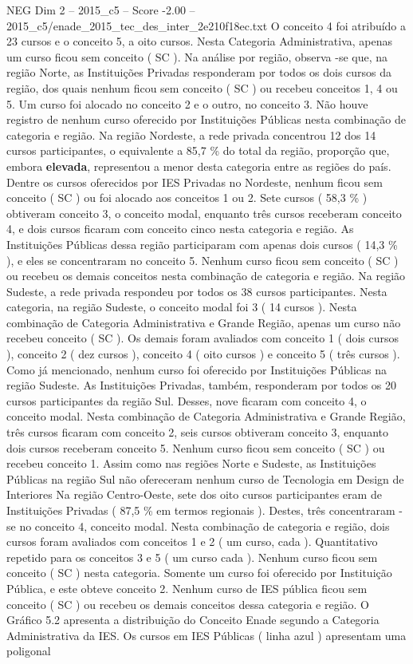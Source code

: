 \begin{textsample}{NEG Dim 2 – 2015\_c5 – Score -2.00 – 2015\_c5/enade\_2015\_tec\_des\_inter\_2e210f18ec.txt}
O conceito 4 foi atribuído a 23 cursos e o conceito 5, a oito cursos.
Nesta Categoria Administrativa, apenas um curso ficou sem conceito ( SC ).
Na análise por região, observa -se que, na região Norte, as Instituições Privadas responderam por todos os dois cursos da região, dos quais nenhum ficou sem conceito ( SC ) ou recebeu conceitos 1, 4 ou 5.
Um curso foi alocado no conceito 2 e o outro, no conceito 3.
Não houve registro de nenhum curso oferecido por Instituições Públicas nesta combinação de categoria e região.
Na região Nordeste, a rede privada concentrou 12 dos 14 cursos participantes, o equivalente a 85,7 \% do total da região, proporção que, embora \textbf{elevada}, representou a menor desta categoria entre as regiões do país.
Dentre os cursos oferecidos por IES Privadas no Nordeste, nenhum ficou sem conceito ( SC ) ou foi alocado aos conceitos 1 ou 2.
Sete cursos ( 58,3 \% ) obtiveram conceito 3, o conceito modal, enquanto três cursos receberam conceito 4, e dois cursos ficaram com conceito cinco nesta categoria e região.
As Instituições Públicas dessa região participaram com apenas dois cursos ( 14,3 \% ), e eles se concentraram no conceito 5.
Nenhum curso ficou sem conceito ( SC ) ou recebeu os demais conceitos nesta combinação de categoria e região.
Na região Sudeste, a rede privada respondeu por todos os 38 cursos participantes.
Nesta categoria, na região Sudeste, o conceito modal foi 3 ( 14 cursos ).
Nesta combinação de Categoria Administrativa e Grande Região, apenas um curso não recebeu conceito ( SC ).
Os demais foram avaliados com conceito 1 ( dois cursos ), conceito 2 ( dez cursos ), conceito 4 ( oito cursos ) e conceito 5 ( três cursos ).
Como já mencionado, nenhum curso foi oferecido por Instituições Públicas na região Sudeste.
As Instituições Privadas, também, responderam por todos os 20 cursos participantes da região Sul.
Desses, nove ficaram com conceito 4, o conceito modal.
Nesta combinação de Categoria Administrativa e Grande Região, três cursos ficaram com conceito 2, seis cursos obtiveram conceito 3, enquanto dois cursos receberam conceito 5.
Nenhum curso ficou sem conceito ( SC ) ou recebeu conceito 1.
Assim como nas regiões Norte e Sudeste, as Instituições Públicas na região Sul não ofereceram nenhum curso de Tecnologia em Design de Interiores Na região Centro-Oeste, sete dos oito cursos participantes eram de Instituições Privadas ( 87,5 \% em termos regionais ).
Destes, três concentraram -se no conceito 4, conceito modal.
Nesta combinação de categoria e região, dois cursos foram avaliados com conceitos 1 e 2 ( um curso, cada ).
Quantitativo repetido para os conceitos 3 e 5 ( um curso cada ).
Nenhum curso ficou sem conceito ( SC ) nesta categoria.
Somente um curso foi oferecido por Instituição Pública, e este obteve conceito 2.
Nenhum curso de IES pública ficou sem conceito ( SC ) ou recebeu os demais conceitos dessa categoria e região.
O Gráfico 5.2 apresenta a distribuição do Conceito Enade segundo a Categoria Administrativa da IES.
Os cursos em IES Públicas ( linha azul ) apresentam uma poligonal

\end{textsample}
